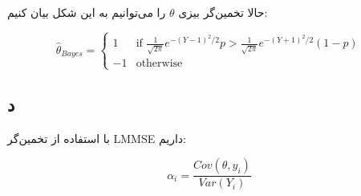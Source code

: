 حالا تخمین‌گر بیزی \(\theta\) را می‌توانیم به این شکل بیان کنیم:

\[
\hat{\theta}_{Bayes} = 
\begin{cases} 
	1 & \text{if } \frac{1}{\sqrt{2 \pi}} e^{-(Y - 1)^2 / 2} p > \frac{1}{\sqrt{2 \pi}} e^{-(Y + 1)^2 / 2} (1 - p) \\
	-1 & \text{otherwise}
\end{cases}
\]


\subsection*{د}

با استفاده از تخمین‌گر LMMSE داریم:

$$
\alpha_i = \frac{Cov (\theta , y_i)}{Var (Y_i)}
$$